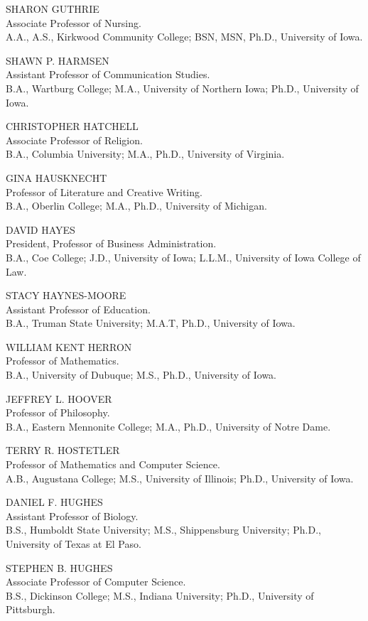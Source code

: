 \documentclass[
  letterpaper,
]{scrbook}
\begin{document}
SHARON GUTHRIE\\
Associate Professor of Nursing.\\
A.A., A.S., Kirkwood Community College; BSN, MSN, Ph.D., University of
Iowa.

SHAWN P. HARMSEN\\
Assistant Professor of Communication Studies.\\
B.A., Wartburg College; M.A., University of Northern Iowa; Ph.D.,
University of Iowa.

CHRISTOPHER HATCHELL\\
Associate Professor of Religion.\\
B.A., Columbia University; M.A., Ph.D., University of Virginia.

GINA HAUSKNECHT\\
Professor of Literature and Creative Writing.\\
B.A., Oberlin College; M.A., Ph.D., University of Michigan.

DAVID HAYES\\
President, Professor of Business Administration.\\
B.A., Coe College; J.D., University of Iowa; L.L.M., University of Iowa
College of Law.

STACY HAYNES-MOORE\\
Assistant Professor of Education.\\
B.A., Truman State University; M.A.T, Ph.D., University of Iowa.

WILLIAM KENT HERRON\\
Professor of Mathematics.\\
B.A., University of Dubuque; M.S., Ph.D., University of Iowa.

JEFFREY L. HOOVER\\
Professor of Philosophy.\\
B.A., Eastern Mennonite College; M.A., Ph.D., University of Notre Dame.

TERRY R. HOSTETLER\\
Professor of Mathematics and Computer Science.\\
A.B., Augustana College; M.S., University of Illinois; Ph.D., University
of Iowa.

DANIEL F. HUGHES\\
Assistant Professor of Biology.\\
B.S., Humboldt State University; M.S., Shippensburg University; Ph.D.,
University of Texas at El Paso.

STEPHEN B. HUGHES\\
Associate Professor of Computer Science.\\
B.S., Dickinson College; M.S., Indiana University; Ph.D., University of
Pittsburgh.
\end{document}
